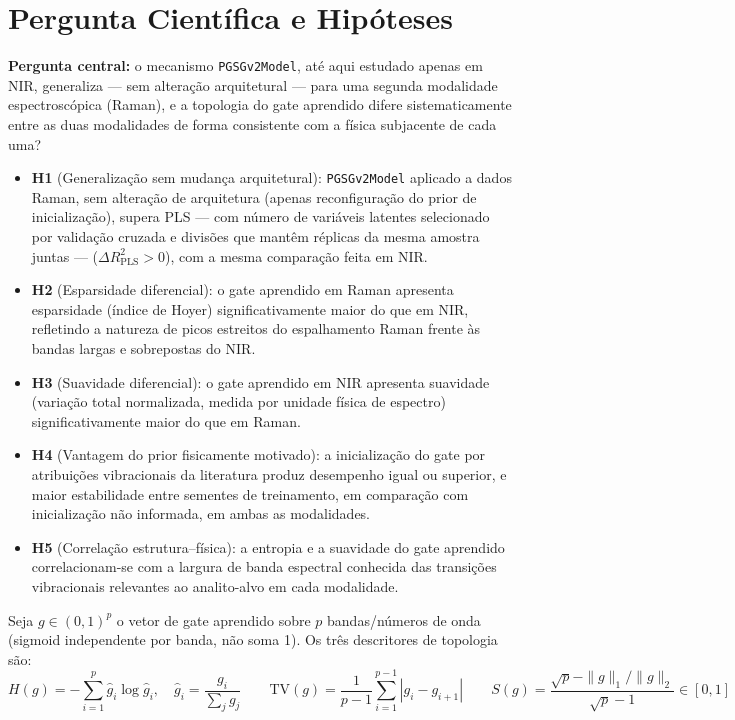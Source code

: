 \documentclass[11pt,a4paper]{article}
\begin{document}
\section{Pergunta Científica e Hipóteses}
\label{sec:hipoteses}

\textbf{Pergunta central:} o mecanismo \texttt{PGSGv2Model}, até aqui estudado apenas em NIR, generaliza --- sem alteração arquitetural --- para uma segunda modalidade espectroscópica (Raman), e a topologia do gate aprendido difere sistematicamente entre as duas modalidades de forma consistente com a física subjacente de cada uma?

\begin{itemize}
\item \textbf{H1} (Generalização sem mudança arquitetural): \texttt{PGSGv2Model} aplicado a dados Raman, sem alteração de arquitetura (apenas reconfiguração do prior de inicialização), supera PLS --- com número de variáveis latentes selecionado por validação cruzada e divisões que mantêm réplicas da mesma amostra juntas --- ($\Delta R^2_{\text{PLS}} > 0$), com a mesma comparação feita em NIR.
\item \textbf{H2} (Esparsidade diferencial): o gate aprendido em Raman apresenta esparsidade (índice de Hoyer) significativamente maior do que em NIR, refletindo a natureza de picos estreitos do espalhamento Raman frente às bandas largas e sobrepostas do NIR.
\item \textbf{H3} (Suavidade diferencial): o gate aprendido em NIR apresenta suavidade (variação total normalizada, medida por unidade física de espectro) significativamente maior do que em Raman.
\item \textbf{H4} (Vantagem do prior fisicamente motivado): a inicialização do gate por atribuições vibracionais da literatura produz desempenho igual ou superior, e maior estabilidade entre sementes de treinamento, em comparação com inicialização não informada, em ambas as modalidades.
\item \textbf{H5} (Correlação estrutura--física): a entropia e a suavidade do gate aprendido correlacionam-se com a largura de banda espectral conhecida das transições vibracionais relevantes ao analito-alvo em cada modalidade.
\end{itemize}

Seja $g \in (0,1)^p$ o vetor de gate aprendido sobre $p$ bandas/números de onda (sigmoid independente por banda, não soma 1). Os três descritores de topologia são:
\[
H(g) = -\sum_{i=1}^{p} \hat{g}_i \log \hat{g}_i, \quad \hat{g}_i = \frac{g_i}{\sum_j g_j}
\qquad
\mathrm{TV}(g) = \frac{1}{p-1}\sum_{i=1}^{p-1} |g_i - g_{i+1}|
\qquad
S(g) = \frac{\sqrt{p} - \|g\|_1/\|g\|_2}{\sqrt{p} - 1} \in [0,1]
\]
\end{document}
